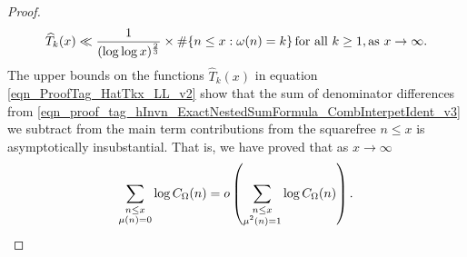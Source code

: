 \documentclass[11pt,reqno,a4letter]{article}
\numberwithin{equation}{section}
\numberwithin{figure}{section}
\numberwithin{table}{section}
\theoremstyle{plain}
\numberwithin{theorem}{section}
\theoremstyle{definition}
\theoremstyle{remark}
\newcommand{\mathtext}[1]{\text{\rm #1}}
\begin{document}
\begin{proof}
\begin{equation}
\label{eqn_ProofTag_HatTkx_LL_v2}
\widehat{T}_k(x) \ll \frac{1}{(\log\log x)^{\frac{2}{3}}} \times 
     \#\{n \leq x: \omega(n)=k\}\, 
     \mathtext{ for all } k \geq 1, \mathtext{ as } x \rightarrow \infty. 
\end{equation}
The upper bounds on the functions $\widehat{T}_k(x)$ in 
equation \eqref{eqn_ProofTag_HatTkx_LL_v2} 
show that the sum of denominator differences from 
\eqref{eqn_proof_tag_hInvn_ExactNestedSumFormula_CombInterpetIdent_v3} we subtract from the 
main term contributions from the squarefree $n \leq x$ is asymptotically insubstantial. 
That is, we have proved that as $x \rightarrow \infty$ 
\[
\sum_{\substack{n \leq x \\ \mu(n)=0}} \log C_{\Omega}(n) = 
     o\left(\sum_{\substack{n \leq x \\ \mu^2(n)=1}} \log C_{\Omega}(n)\right). 
     \qedhere
\]
\end{proof}
\end{document}
